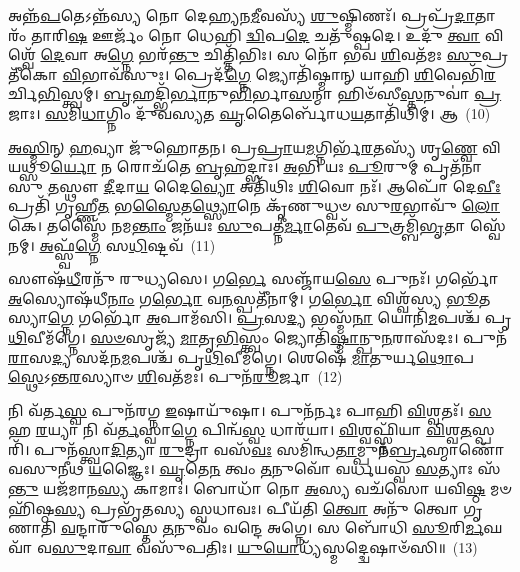 𑌅𑌨𑍍𑌨᳴\-\ul{𑌪}\-𑌤𑍇\-𑌽𑌨𑍍𑌨᳴𑌸𑍍𑌯 𑌨𑍋 𑌦𑍇𑌹𑍍𑌯𑌨\-\ul{𑌮𑍀}\-𑌵𑌸𑍍𑌯᳴ \ul{𑌶𑍁}\-𑌷𑍍𑌮𑌿𑌣𑌃᳴। 𑌪𑍍𑌰𑌪𑍍𑌰᳴\-\ul{𑌦𑌾}\-𑌤𑌾𑌰𑌂᳴ 𑌤𑌾𑌰𑌿\-\ul{𑌷} 𑌊𑌰𑍍𑌜𑌂᳴ 𑌨𑍋 𑌧𑍇𑌹𑌿 \ul{𑌦𑍍𑌵𑌿}\-𑌪\-\ul{𑌦𑍇} 𑌚𑌤𑍁᳴𑌷𑍍𑌪𑌦𑍇। 𑌉𑌦𑍁᳴ \ul{𑌤𑍍𑌵𑌾} 𑌵𑌿𑌶𑍍𑌵𑍇᳴ \ul{𑌦𑍇}\-𑌵𑌾 𑌅\-\ul{𑌗𑍍𑌨𑍇} 𑌭𑌰᳴\-\ul{𑌨𑍍𑌤𑍁} 𑌚𑌿𑌤𑍍𑌤𑌿᳴𑌭𑌿𑌃। 𑌸 𑌨𑍋᳴ 𑌭𑌵 \ul{𑌶𑌿}\-𑌵𑌤᳴𑌮𑌃 \ul{𑌸𑍁}\-𑌪𑍍𑌰𑌤𑍀᳴𑌕𑍋 \ul{𑌵𑌿}\-𑌭𑌾𑌵᳴𑌸𑍁𑌃। 𑌪𑍍𑌰𑍇𑌦᳴\-\ul{𑌗𑍍𑌨𑍇} 𑌜𑍍𑌯𑍋𑌤𑌿᳴𑌷𑍍𑌮𑌾𑌨𑍍 𑌯𑌾𑌹𑌿 \ul{𑌶𑌿}\-𑌵𑍇𑌭𑌿᳴\-\ul{𑌰}\-𑌰𑍍𑌚𑌿\-\ul{𑌭𑌿}\-𑌸𑍍𑌤𑍍𑌵𑌮𑍍। \ul{𑌬𑍃}\-𑌹𑌦𑍍𑌭𑌿᳴\-\ul{𑌰𑍍𑌭𑌾}\-𑌨𑍁\-\ul{𑌭𑌿}\-𑌰𑍍𑌭𑌾\-\ul{𑌸}\-𑌨𑍍𑌮𑌾 𑌹𑌿𑍞᳴𑌸𑍀\-\ul{𑌸𑍍𑌤}\-𑌨𑍁𑌵𑌾॑ \ul{𑌪𑍍𑌰}\-𑌜𑌾𑌃। \ul{𑌸}\-𑌮𑌿\-\ul{𑌧𑌾}\-𑌗𑍍𑌨𑌿𑌂 𑌦𑍁᳴𑌵𑌸𑍍𑌯𑌤 \ul{𑌘𑍃}\-𑌤𑍈𑌰𑍍𑌬𑍋᳴𑌧\-\ul{𑌯}\-𑌤𑌾𑌤𑌿᳴𑌥𑌿𑌮𑍍। 𑌆~(10)

\-\ul{𑌅}\-\-\ul{𑌸𑍍𑌮𑌿}\-𑌨𑍍 \ul{𑌹}\-𑌵𑍍𑌯𑌾 𑌜𑍁᳴𑌹𑍋𑌤𑌨। 𑌪𑍍𑌰\-\ul{𑌪𑍍𑌰𑌾}\-𑌯\-\ul{𑌮}\-𑌗𑍍𑌨𑌿𑌰𑍍𑌭᳴\-\ul{𑌰}\-𑌤𑌸𑍍𑌯᳴ 𑌶𑍃\-\ul{𑌣𑍍𑌵𑍇} 𑌵𑌿 𑌯𑌥𑍍𑌸𑍂\-\ul{𑌰𑍍𑌯𑍋} 𑌨 𑌰𑍋𑌚᳴𑌤𑍇 \ul{𑌬𑍃}\-𑌹𑌦𑍍𑌭𑌾𑌃। \ul{𑌅}\-𑌭𑌿 𑌯𑌃 \ul{𑌪𑍂}\-𑌰𑍁𑌮𑍍 𑌪𑍃𑌤᳴𑌨𑌾𑌸𑍁 \ul{𑌤}\-𑌸𑍍𑌥𑍗 \ul{𑌦𑍀}\-𑌦𑌾\-\ul{𑌯} 𑌦𑍈\-\ul{𑌵𑍍𑌯𑍋} 𑌅𑌤𑌿᳴𑌥𑌿𑌃 \ul{𑌶𑌿}\-𑌵𑍋 𑌨𑌃᳴। 𑌆𑌪𑍋᳴ 𑌦𑍇\-\ul{𑌵𑍀𑌃} 𑌪𑍍𑌰𑌤𑌿᳴ 𑌗𑍃𑌹𑍍𑌣𑍀\-\ul{𑌤} 𑌭\-\ul{𑌸𑍍𑌮𑍈}\-𑌤\-\ul{𑌥𑍍𑌸𑍍𑌯𑍋}\-𑌨𑍇 𑌕𑍃᳴𑌣𑍁𑌧𑍍𑌵𑍞 𑌸𑍁\-\ul{𑌰}\-𑌭𑌾𑌵𑍁᳴ \ul{𑌲𑍋}\-𑌕𑍇। 𑌤𑌸𑍍𑌮𑍈᳴ 𑌨𑌮\-\ul{𑌨𑍍𑌤𑌾𑌂} 𑌜𑌨᳴𑌯𑌃 \ul{𑌸𑍁}\-𑌪𑌤𑍍𑌨𑍀॑\-\ul{𑌰𑍍𑌮𑌾}\-𑌤𑍇𑌵᳴ \ul{𑌪𑍁}\-𑌤𑍍𑌰𑌮𑍍𑌬𑌿᳴\-\ul{𑌭𑍃}\-𑌤𑌾 𑌸𑍍𑌵𑍇᳴𑌨𑌮𑍍। \ul{𑌅}\-𑌫𑍍𑌸𑍍𑌵᳴\-\ul{𑌗𑍍𑌨𑍇} 𑌸\-\ul{𑌧𑌿}\-𑌷𑍍𑌟𑌵᳴~(11)

𑌸𑍗𑌷᳴\-\ul{𑌧𑍀}\-𑌰𑌨𑍁᳴ 𑌰𑍁𑌧𑍍𑌯𑌸𑍇। 𑌗\-\ul{𑌰𑍍𑌭𑍇} 𑌸𑌞𑍍𑌜𑌾᳴𑌯\-\ul{𑌸𑍇} 𑌪𑍁𑌨𑌃᳴। 𑌗𑌰𑍍𑌭𑍋᳴ \ul{𑌅}\-𑌸𑍍𑌯𑍋𑌷᳴𑌧𑍀\-\ul{𑌨𑌾𑌂} 𑌗\-\ul{𑌰𑍍𑌭𑍋} 𑌵\-\ul{𑌨}\-𑌸𑍍𑌪𑌤𑍀᳴𑌨𑌾𑌮𑍍। 𑌗\-\ul{𑌰𑍍𑌭𑍋} 𑌵𑌿𑌶𑍍𑌵᳴𑌸𑍍𑌯 \ul{𑌭𑍂}\-𑌤𑌸𑍍𑌯𑌾\-\ul{𑌗𑍍𑌨𑍇} 𑌗𑌰𑍍𑌭𑍋᳴ \ul{𑌅}\-𑌪𑌾𑌮᳴𑌸𑌿। \ul{𑌪𑍍𑌰}\-𑌸\-\ul{𑌦𑍍𑌯} 𑌭𑌸𑍍𑌮᳴\-\ul{𑌨𑌾} 𑌯𑍋𑌨𑌿᳴\-\ul{𑌮}\-𑌪𑌶𑍍𑌚᳴ 𑌪𑍃\-\ul{𑌥𑌿}\-𑌵𑍀𑌮᳴𑌗𑍍𑌨𑍇। \ul{𑌸}\-\-\ul{𑍞}\-𑌸𑍃𑌜𑍍𑌯᳴ \ul{𑌮𑌾}\-𑌤𑍃\-\ul{𑌭𑌿}\-𑌸𑍍𑌤𑍍𑌵𑌂 𑌜𑍍𑌯𑍋𑌤𑌿᳴\-\ul{𑌷𑍍𑌮𑌾}\-𑌨𑍍𑌪𑍁\-\ul{𑌨}\-𑌰𑌾𑌸᳴𑌦𑌃। 𑌪𑍁𑌨᳴\-\ul{𑌰𑌾}\-𑌸\-\ul{𑌦𑍍𑌯} 𑌸𑌦᳴𑌨\-\ul{𑌮}\-𑌪𑌶𑍍𑌚᳴ 𑌪𑍃\-\ul{𑌥𑌿}\-𑌵𑍀𑌮᳴𑌗𑍍𑌨𑍇। 𑌶𑍇𑌷𑍇᳴ \ul{𑌮𑌾}\-𑌤𑍁𑌰𑍍𑌯\-\ul{𑌥𑍋}\-𑌪\-\ul{𑌸𑍍𑌥𑍇}\-\-𑌽𑌨𑍍𑌤\-\ul{𑌰}\-𑌸𑍍𑌯𑌾𑍞 \ul{𑌶𑌿}\-𑌵𑌤᳴𑌮𑌃। 𑌪𑍁𑌨᳴\-\ul{𑌰𑍂}\-𑌰𑍍𑌜𑌾~(12)

𑌨𑌿 𑌵᳴𑌰𑍍𑌤\-\ul{𑌸𑍍𑌵} 𑌪𑍁𑌨᳴𑌰𑌗𑍍𑌨 \ul{𑌇}\-𑌷𑌾𑌯𑍁᳴𑌷𑌾। 𑌪𑍁𑌨᳴𑌰𑍍𑌨𑌃 𑌪𑌾𑌹𑌿 \ul{𑌵𑌿}\-𑌶𑍍𑌵𑌤𑌃᳴। \ul{𑌸}\-𑌹 \ul{𑌰}\-𑌯𑍍𑌯𑌾 𑌨𑌿 𑌵᳴\-\ul{𑌰𑍍𑌤}\-𑌸𑍍𑌵𑌾\-\ul{𑌗𑍍𑌨𑍇} 𑌪𑌿𑌨𑍍𑌵᳴\-\ul{𑌸𑍍𑌵} 𑌧𑌾𑌰᳴𑌯𑌾। \ul{𑌵𑌿}\-𑌶𑍍𑌵𑌫𑍍𑌸𑍍𑌨𑌿᳴𑌯𑌾 \ul{𑌵𑌿}\-𑌶𑍍𑌵\-\ul{𑌤}\-𑌸𑍍𑌪𑌰𑌿᳴। 𑌪𑍁𑌨᳴𑌸𑍍𑌤𑍍𑌵𑌾\-\ul{𑌦𑌿}\-𑌤𑍍𑌯𑌾 \ul{𑌰𑍁}\-𑌦𑍍𑌰𑌾 𑌵𑌸᳴\-\ul{𑌵𑌃} 𑌸𑌮𑌿᳴𑌨𑍍𑌧\-\ul{𑌤𑌾}\-𑌮𑍍𑌪𑍁𑌨᳴\-\ul{𑌰𑍍𑌬𑍍𑌰}\-𑌹𑍍𑌮𑌾𑌣𑍋᳴ 𑌵𑌸𑍁𑌨𑍀𑌥 \ul{𑌯}\-𑌜𑍍𑌞𑍈𑌃। \ul{𑌘𑍃}\-𑌤𑍇\-\ul{𑌨} 𑌤𑍍𑌵𑌂 \ul{𑌤}\-𑌨𑍁𑌵𑍋᳴ 𑌵𑌰𑍍𑌧𑌯𑌸𑍍𑌵 \ul{𑌸}\-𑌤𑍍𑌯𑌾𑌃 𑌸᳴\-\ul{𑌨𑍍𑌤𑍁} 𑌯𑌜᳴𑌮𑌾𑌨\-\ul{𑌸𑍍𑌯} 𑌕𑌾𑌮𑌾𑌃॑। 𑌬𑍋𑌧𑌾᳴ 𑌨𑍋 \ul{𑌅}\-𑌸𑍍𑌯 𑌵𑌚᳴𑌸𑍋 𑌯𑌵𑌿\-\ul{𑌷𑍍𑌠} 𑌮𑍞𑌹𑌿᳴𑌷𑍍𑌠\-\ul{𑌸𑍍𑌯} 𑌪𑍍𑌰𑌭𑍃᳴𑌤𑌸𑍍𑌯 𑌸𑍍𑌵𑌧𑌾𑌵𑌃। 𑌪𑍀𑌯᳴𑌤𑌿 \ul{𑌤𑍍𑌵𑍋} 𑌅𑌨𑍁᳴ 𑌤𑍍𑌵𑍋 𑌗𑍃𑌣𑌾𑌤𑌿 \ul{𑌵}\-𑌨𑍍𑌦𑌾𑌰𑍁᳴𑌸𑍍𑌤𑍇 \ul{𑌤}\-𑌨𑍁𑌵𑌂᳴ 𑌵𑌨𑍍𑌦𑍇 𑌅𑌗𑍍𑌨𑍇। 𑌸 𑌬𑍋᳴𑌧𑌿 \ul{𑌸𑍂}\-𑌰𑌿\-\ul{𑌰𑍍𑌮}\-𑌘𑌵𑌾᳴ 𑌵\-\ul{𑌸𑍁}\-𑌦𑌾\-\ul{𑌵𑌾} 𑌵𑌸𑍁᳴𑌪𑌤𑌿𑌃। \ul{𑌯𑍁}\-\-\ul{𑌯𑍋}\-𑌧𑍍𑌯᳴𑌸𑍍𑌮𑌦𑍍𑌦𑍍𑌵𑍇𑌷𑌾𑍞᳴𑌸𑌿॥~(13)

{\anuvakamend[{𑌆 𑌤\-\ul{𑌵𑍋}\-𑌰𑍍𑌜𑌾\-𑌽\-\ul{𑌨𑍁} 𑌷𑍋𑌡᳴𑌶 𑌚}]}%

